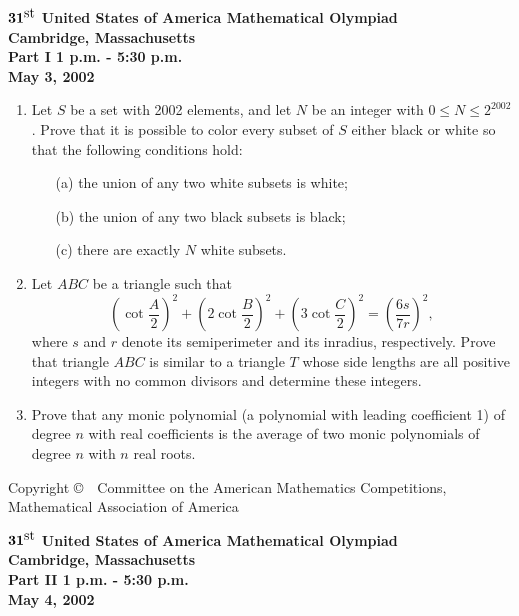 \documentclass[12pt]{article}
\def\be{\begin{enumerate}}
\def\ii{\item}
\def\st{^{\scriptstyle\mbox{st}}}
\begin{document}
%

\begin{center}
${\bf 31\st}$ {\bf United States of America Mathematical Olympiad}
\\[.1in]
{\bf Cambridge, Massachusetts}\\[.05in]
{\bf Part I \hspace{.25in}  1 p.m. - 5:30 p.m.}\\[.05in]
{\bf May 3, 2002}
\end{center}

\bigskip 

\be
\ii %
Let $S$ be a set with 2002 elements, and let $N$ be an integer with
$0 \leq N \leq 2^{2002}$. Prove that it is possible to color every
subset of $S$ either black or white so that the following conditions
hold:
\begin{enumerate}
\item[(a)] the union of any two white subsets is white;
\item[(b)] the union of any two black subsets is black;
\item[(c)] there are exactly $N$ white subsets.
\end{enumerate}

\ii %
Let $ABC$ be a triangle such that
\[
\left( \cot \frac{A}{2} \right)^2 +
\left( 2\cot \frac{B}{2} \right)^2 +
\left( 3\cot \frac{C}{2} \right)^2 =
 \left( \frac{6s}{7r} \right)^2,
\]
where $s$ and $r$ denote its semiperimeter and its inradius, respectively.
Prove that triangle $ABC$ is similar to a triangle $T$ whose side lengths
are all positive integers with no common divisors and
determine these integers.

\ii %
Prove that any monic polynomial (a polynomial with leading coefficient 1)
of degree $n$ with real coefficients is the average of two monic polynomials
of degree $n$ with $n$ real roots.

\end{enumerate}

\vspace{80 mm}

{\small
\begin{center}
Copyright \copyright \ \ Committee on the American  Mathematics  Competitions,\\
Mathematical Association of America
\end{center}
}
\newpage

\begin{center}
${\bf 31\st}$ {\bf United States of America Mathematical Olympiad}
\\[.1in]
{\bf Cambridge, Massachusetts}\\[.05in]
{\bf Part II \hspace{.25in}  1 p.m. - 5:30 p.m.}\\[.05in]
{\bf May 4, 2002}
\end{center}
\end{document}
